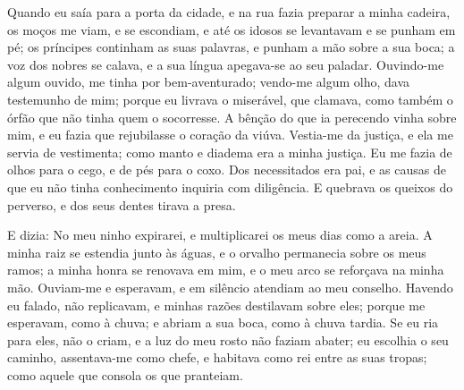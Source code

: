 Quando eu saía para a porta da cidade, e na rua fazia preparar a
minha cadeira, os moços me viam, e se escondiam, e até os idosos
se levantavam e se punham em pé; os príncipes continham as suas
palavras, e punham a mão sobre a sua boca; a voz dos nobres
se calava, e a sua língua apegava-se ao seu paladar.
Ouvindo-me algum ouvido, me tinha por bem-aventurado;
vendo-me algum olho, dava testemunho de mim; porque eu
livrava o miserável, que clamava, como também o órfão que não tinha
quem o socorresse. A bênção do que ia perecendo vinha sobre
mim, e eu fazia que rejubilasse o coração da viúva. Vestia-me
da justiça, e ela me servia de vestimenta; como manto e diadema era
a minha justiça. Eu me fazia de olhos para o cego, e de pés
para o coxo. Dos necessitados era pai, e as causas de que eu
não tinha conhecimento inquiria com diligência. E quebrava os
queixos do perverso, e dos seus dentes tirava a presa.

E dizia: No meu ninho expirarei, e multiplicarei os meus dias
como a areia. A minha raiz se estendia junto às águas, e o
orvalho permanecia sobre os meus ramos; a minha honra se
renovava em mim, e o meu arco se reforçava na minha mão.
Ouviam-me e esperavam, e em silêncio atendiam ao meu
conselho. Havendo eu falado, não replicavam, e minhas razões
destilavam sobre eles; porque me esperavam, como à chuva; e
abriam a sua boca, como à chuva tardia. Se eu ria para eles,
não o criam, e a luz do meu rosto não faziam abater; eu
escolhia o seu caminho, assentava-me como chefe, e habitava como rei
entre as suas tropas; como aquele que consola os que pranteiam.

\medskip

